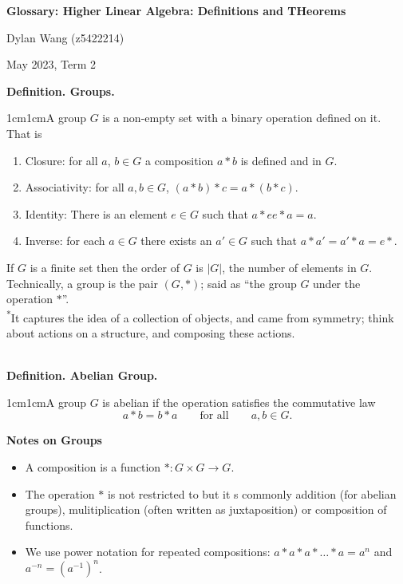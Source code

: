 \documentclass{article}
\newcommand{\definition}[2]{\textbf{Definition. #1.}\begin{adjustwidth}{1cm}{1cm}#2\end{adjustwidth}}
\begin{document}
\begin{titlepage}
    \centering
    \vspace*{\fill}

    \vspace*{0.5cm}

    \huge\bfseries
    Glossary: Higher Linear Algebra: Definitions and THeorems

    \vspace*{2cm}

    \large Dylan Wang (z5422214)

    \vspace*{2cm}

    \large May 2023, Term 2

    \vspace*{\fill}
\end{titlepage}
\newpage
\definition{Groups}{A group $G$ is a non-empty set with a binary operation defined on it. That is \begin{enumerate} \item Closure: for all $a$, $b \in G$ a composition $a * b$ is defined and in $G$.\item Associativity: for all $a,b \in G$, $(a*b)*c=a*(b*c)$. \item Identity: There is an element $e \in G$ such that $a * e e * a = a$. \item Inverse: for each $a \in G$ there exists an $a' \in G$ such that $a * a' = a' * a = e*.$ \end{enumerate}If $G$ is a finite set then the order of $G$ is $|G|$, the number of elements in $G$. Technically, a group is the pair $(G, *)$; said as ``the group $G$ under the operation $*$''.\\[1\baselineskip]\textsuperscript{*}It captures the idea of a collection of objects, and came from symmetry; think about actions on a structure, and composing these actions.}~\\
\definition{Abelian Group}{A group $G$ is abelian if the operation satisfies the commutative law \[a * b = b * a \qquad \text{for all} \qquad a,b \in G.\]}
\textbf{Notes on Groups}\begin{itemize}
  \item A composition is a function $*: G \times G \rightarrow G$.
  \item The operation $*$ is not restricted to but it s commonly addition (for abelian groups), mulitiplication (often written as juxtaposition) or composition of functions.
  \item We use power notation for repeated compositions: $a * a * a * \ldots * a = a^n$ and $a^{-n} = (a^{-1})^n$.
\end{itemize}
\end{document}
